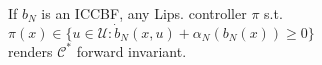 \documentclass[preview]{standalone}
\begin{document}
\begin{center}
If $b_N$ is an ICCBF, any Lips. controller $\pi$ s.t.\\$\pi(x) \in \{ u \in \mathcal{U} : \dot b_N(x, u) + \alpha_N(b_N(x)) \geq 0 \}$\\renders $\mathcal{C}^*$ forward invariant.
\end{center}
\end{document}
